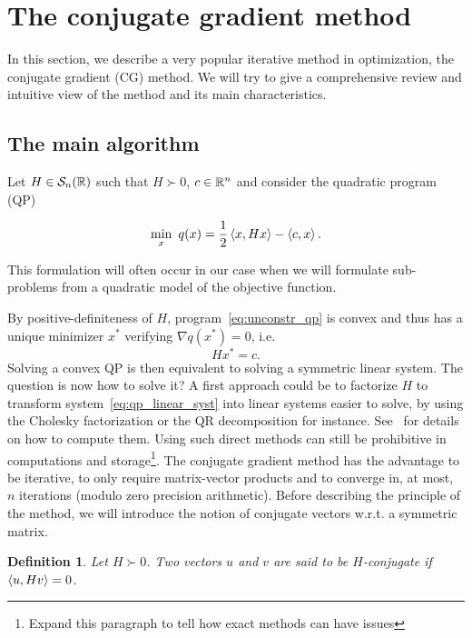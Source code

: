 \documentclass[10pt]{article}
\newtheorem{definition}[theorem]{Definition}
\numberwithin{equation}{section}
\begin{document}
	\section{The conjugate gradient method}
	
	In this section, we describe a very popular iterative method in optimization, the conjugate gradient (CG) method. We will try to give a comprehensive review and intuitive view of the method and its main characteristics. 
	
	\subsection{The main algorithm}
	
	Let $H \in {\mathcal{S}}_n({\mathbb{R}})$ such that $H \succ 0$, $c \in {\mathbb{R}}^n$ and consider the quadratic program (QP)
	
	\begin{equation}\label{eq:unconstr_qp}
		\min_x \ q(x) = \dfrac{1}{2} \left\langle {x} , {Hx} \right\rangle - \left\langle {c} , {x} \right\rangle.
	\end{equation}
	
	This formulation will often occur in our case when we will formulate sub-problems from a quadratic model of the objective function.
	
	
	By positive-definiteness of $H$, program~\eqref{eq:unconstr_qp} is convex and thus has a unique minimizer $x^*$ verifying $\nabla q(x^*)=0$, i.e.
	\begin{equation}\label{eq:qp_linear_syst}
		Hx^* = c.
	\end{equation}
	Solving a convex QP is then equivalent to solving a symmetric linear system. The question is now how to solve it? A first approach could be to factorize $H$ to transform system~\eqref{eq:qp_linear_syst} into linear systems easier to solve, by using the Cholesky factorization or the QR decomposition for instance. See~\cite{golubvanloan:2013} for details on how to compute them. Using such direct methods can  still be prohibitive in computations and storage\footnote{Expand this paragraph to tell how exact methods can have issues}. The conjugate gradient method has the advantage to be iterative, to only require matrix-vector products and to converge in, at most, $n$ iterations (modulo zero precision arithmetic). Before describing the principle of the method, we will introduce the notion of conjugate vectors w.r.t. a symmetric matrix.
	
	\begin{definition}\label{def:conjugate_vectors}
		Let $H \succ 0$. Two vectors $u$ and $v$ are said to be $H$-conjugate if $\left\langle {u} , {Hv} \right\rangle=0$.
	\end{definition} 
	
\end{document}
